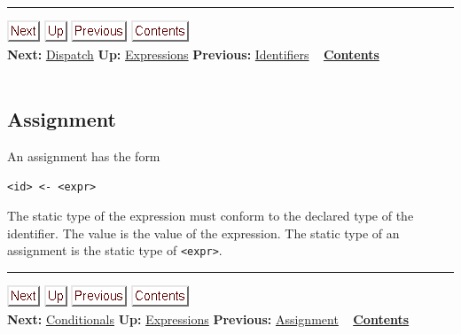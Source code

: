 \documentclass[]{article}
\begin{document}
\begin{center}\rule{3in}{0.4pt}\end{center}

\href{node17.html}{\includegraphics{next.png}}
\href{node13.html}{\includegraphics{up.png}}
\href{node15.html}{\includegraphics{prev.png}}
\href{node1.html}{\includegraphics{contents.png}} \\ \textbf{Next:}
\href{node17.html}{Dispatch} \textbf{Up:}
\href{node13.html}{Expressions} \textbf{Previous:}
\href{node15.html}{Identifiers} ~ \textbf{\href{node1.html}{Contents}}
\\ \\

\subsection{Assignment}

An assignment has the form

\begin{verbatim}
<id> <- <expr>
\end{verbatim}

The static type of the expression must conform to the declared type of
the identifier. The value is the value of the expression. The static
type of an assignment is the static type of
\texttt{\textless{}expr\textgreater{}}.

\begin{center}\rule{3in}{0.4pt}\end{center}

\href{node18.html}{\includegraphics{next.png}}
\href{node13.html}{\includegraphics{up.png}}
\href{node16.html}{\includegraphics{prev.png}}
\href{node1.html}{\includegraphics{contents.png}} \\ \textbf{Next:}
\href{node18.html}{Conditionals} \textbf{Up:}
\href{node13.html}{Expressions} \textbf{Previous:}
\href{node16.html}{Assignment} ~ \textbf{\href{node1.html}{Contents}} \\
\\
\end{document}
